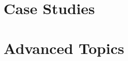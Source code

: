 \documentclass[oneside]{gsm-l} %
\numberwithin{section}{chapter}
\numberwithin{equation}{chapter}
\numberwithin{figure}{chapter}
\begin{document}
\part{Case Studies}



\part{Advanced Topics}

\appendix




\backmatter
{\RaggedRight

}


\printindex
\end{document}
